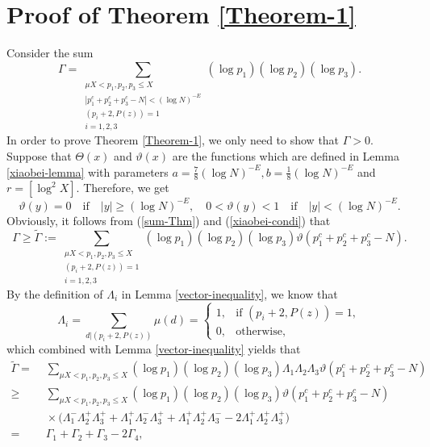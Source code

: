 \documentclass[a4paper,oneside,11pt]{article}%
\numberwithin{equation}{section}
\begin{document}
\section{Proof of Theorem \ref{Theorem-1}}
Consider the sum
\begin{equation}\label{sum-Thm}
 \Gamma=\sum_{\substack{\mu X<p_1,p_2,p_3\leqslant X\\ |p_1^c+p_2^c+p_3^c-N|<(\log N)^{-E}\\ (p_i+2,P(z))=1\\ i=1,2,3}}
        (\log p_1)(\log p_2)(\log p_3).
\end{equation}
In order to prove Theorem \ref{Theorem-1}, we only need to show that $\Gamma>0$. Suppose that $\Theta(x)$ and $\vartheta(x)$
are the functions which are defined in Lemma \ref{xiaobei-lemma} with parameters
$a=\frac{7}{8}(\log N)^{-E},b=\frac{1}{8}(\log N)^{-E}$ and $r=[\log^2X]$. Therefore, we get
\begin{equation}\label{xiaobei-condi}
  \vartheta(y)=0\quad \textrm{if}\quad |y|\geqslant(\log N)^{-E},\quad 0<\vartheta(y)<1\quad
  \textrm{if}\quad |y|<(\log N)^{-E}.
\end{equation}
Obviously, it follows from (\ref{sum-Thm}) and (\ref{xiaobei-condi}) that
\begin{equation}\label{Gamma-lower-1}
 \Gamma\geqslant\widetilde{\Gamma}:=\sum_{\substack{\mu X<p_1,p_2,p_3\leqslant X\\ (p_i+2,P(z))=1\\ i=1,2,3}}
 (\log p_1)(\log p_2)(\log p_3)\vartheta(p_1^c+p_2^c+p_3^c-N).
\end{equation}
By the definition of $\Lambda_i$ in Lemma \ref{vector-inequality}, we know that
\begin{equation*}
 \Lambda_i=\sum_{d|(p_i+2,P(z))}\mu(d)=
 \begin{cases}
   1, & \textrm{if $(p_i+2,P(z))=1$},  \\
   0, & \textrm{otherwise},
 \end{cases}
\end{equation*}
which combined with Lemma \ref{vector-inequality} yields that
\begin{align*}
           \widetilde{\Gamma}
  = & \,\, \sum_{\mu X<p_1,p_2,p_3\leqslant X}(\log p_1)(\log p_2)(\log p_3)\Lambda_1\Lambda_2\Lambda_3
           \vartheta(p_1^c+p_2^c+p_3^c-N)
                 \nonumber \\
\geqslant & \,\, \sum_{\mu X<p_1,p_2,p_3\leqslant X}(\log p_1)(\log p_2)(\log p_3)\vartheta(p_1^c+p_2^c+p_3^c-N)
                 \nonumber \\
    & \,\, \times\big(\Lambda_1^-\Lambda_2^+\Lambda_3^++\Lambda_1^+\Lambda_2^-\Lambda_3^+
            +\Lambda_1^+\Lambda_2^+\Lambda_3^- -2\Lambda_1^+\Lambda_2^+\Lambda_3^+\big)
                 \nonumber \\
  = & \,\, \Gamma_1+\Gamma_2+\Gamma_3-2\Gamma_4,
\end{align*}
\end{document}
